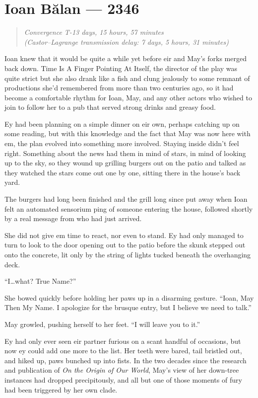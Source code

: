 \hypertarget{ioan-bux103lan-2346}{%
\chapter{Ioan Bălan — 2346}\label{ioan-bux103lan-2346}}

\begin{quote}
\emph{Convergence T-13 days, 15 hours, 57 minutes}\\
\emph{(Castor--Lagrange transmission delay: 7 days, 5 hours, 31 minutes)}
\end{quote}

Ioan knew that it would be quite a while yet before eir and May's forks merged back down. Time Is A Finger Pointing At Itself, the director of the play was quite strict but she also drank like a fish and clung jealously to some remnant of productions she'd remembered from more than two centuries ago, so it had become a comfortable rhythm for Ioan, May, and any other actors who wished to join to follow her to a pub that served strong drinks and greasy food.

Ey had been planning on a simple dinner on eir own, perhaps catching up on some reading, but with this knowledge and the fact that May was now here with em, the plan evolved into something more involved. Staying inside didn't feel right. Something about the news had them in mind of stars, in mind of looking up to the sky, so they wound up grilling burgers out on the patio and talked as they watched the stars come out one by one, sitting there in the house's back yard.

The burgers had long been finished and the grill long since put away when Ioan felt an automated sensorium ping of someone entering the house, followed shortly by a real message from who had just arrived.

She did not give em time to react, nor even to stand. Ey had only managed to turn to look to the door opening out to the patio before the skunk stepped out onto the concrete, lit only by the string of lights tucked beneath the overhanging deck.

``I\ldots what? True Name?''

She bowed quickly before holding her paws up in a disarming gesture. ``Ioan, May Then My Name. I apologize for the brusque entry, but I believe we need to talk.''

May growled, pushing herself to her feet. ``I will leave you to it.''

Ey had only ever seen eir partner furious on a scant handful of occasions, but now ey could add one more to the list. Her teeth were bared, tail bristled out, and hiked up, paws bunched up into fists. In the two decades since the research and publication of \emph{On the Origin of Our World}, May's view of her down-tree instances had dropped precipitously, and all but one of those moments of fury had been triggered by her own clade.

